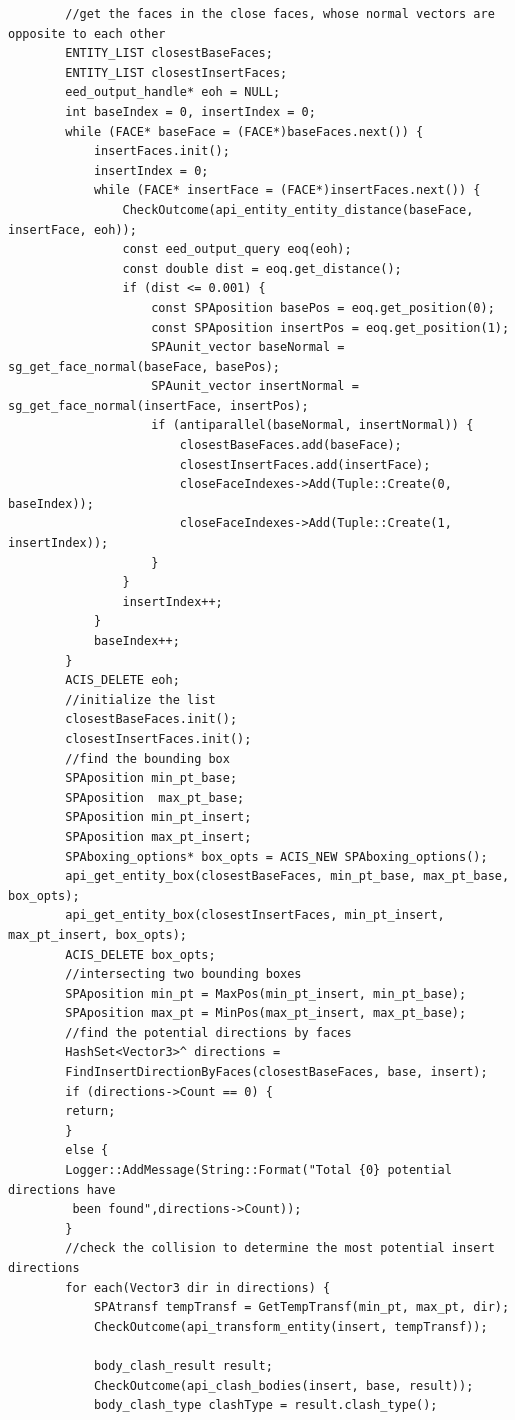 \documentclass[14pt,a4paper,titlepage]{article}
\begin{document}
\begin{itemize}
\begin{lstlisting}
		//get the faces in the close faces, whose normal vectors are opposite to each other
		ENTITY_LIST closestBaseFaces;
		ENTITY_LIST closestInsertFaces;
		eed_output_handle* eoh = NULL;
		int baseIndex = 0, insertIndex = 0;
		while (FACE* baseFace = (FACE*)baseFaces.next()) {
			insertFaces.init();
			insertIndex = 0;
			while (FACE* insertFace = (FACE*)insertFaces.next()) {
				CheckOutcome(api_entity_entity_distance(baseFace, insertFace, eoh));
				const eed_output_query eoq(eoh);
				const double dist = eoq.get_distance();
				if (dist <= 0.001) {
					const SPAposition basePos = eoq.get_position(0);
					const SPAposition insertPos = eoq.get_position(1);
					SPAunit_vector baseNormal = sg_get_face_normal(baseFace, basePos);
					SPAunit_vector insertNormal = sg_get_face_normal(insertFace, insertPos);
					if (antiparallel(baseNormal, insertNormal)) {
						closestBaseFaces.add(baseFace);
						closestInsertFaces.add(insertFace);
						closeFaceIndexes->Add(Tuple::Create(0, baseIndex));
						closeFaceIndexes->Add(Tuple::Create(1, insertIndex));
					}	
				}
				insertIndex++;
			}
			baseIndex++;
		} 
		ACIS_DELETE eoh;
		//initialize the list
		closestBaseFaces.init();
		closestInsertFaces.init();
		//find the bounding box
		SPAposition min_pt_base;
		SPAposition  max_pt_base;
		SPAposition min_pt_insert;
		SPAposition max_pt_insert;
		SPAboxing_options* box_opts = ACIS_NEW SPAboxing_options();
		api_get_entity_box(closestBaseFaces, min_pt_base, max_pt_base, box_opts);
		api_get_entity_box(closestInsertFaces, min_pt_insert, max_pt_insert, box_opts);
		ACIS_DELETE box_opts;
		//intersecting two bounding boxes
		SPAposition min_pt = MaxPos(min_pt_insert, min_pt_base);
		SPAposition max_pt = MinPos(max_pt_insert, max_pt_base);
		//find the potential directions by faces
		HashSet<Vector3>^ directions =
		FindInsertDirectionByFaces(closestBaseFaces, base, insert);
		if (directions->Count == 0) {
		return;
		}
		else {
		Logger::AddMessage(String::Format("Total {0} potential directions have
		 been found",directions->Count));
		}
		//check the collision to determine the most potential insert directions
		for each(Vector3 dir in directions) {
			SPAtransf tempTransf = GetTempTransf(min_pt, max_pt, dir);
			CheckOutcome(api_transform_entity(insert, tempTransf));
			
			body_clash_result result;
			CheckOutcome(api_clash_bodies(insert, base, result));
			body_clash_type clashType = result.clash_type();
		

\end{lstlisting}
\end{itemize}
\end{document}
